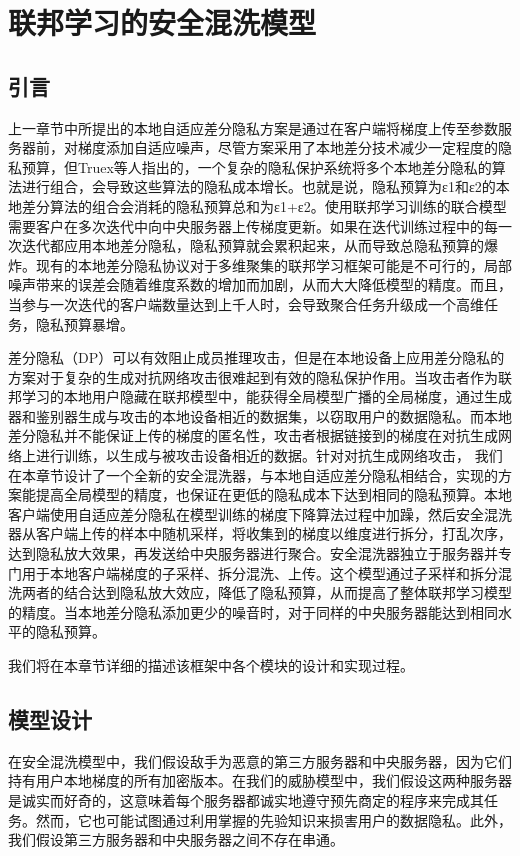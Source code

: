 \chapter{联邦学习的安全混洗模型}
\label{ch4}
\section{引言}
上一章节中所提出的本地自适应差分隐私方案是通过在客户端将梯度上传至参数服务器前，对梯度添加自适应噪声，尽管方案采用了本地差分技术减少一定程度的隐私预算，但Truex等人指出的，一个复杂的隐私保护系统将多个本地差分隐私的算法进行组合，会导致这些算法的隐私成本增长。也就是说，隐私预算为ε1和ε2的本地差分算法的组合会消耗的隐私预算总和为ε1+ε2。使用联邦学习训练的联合模型需要客户在多次迭代中向中央服务器上传梯度更新。如果在迭代训练过程中的每一次迭代都应用本地差分隐私，隐私预算就会累积起来，从而导致总隐私预算的爆炸。现有的本地差分隐私协议对于多维聚集的联邦学习框架可能是不可行的，局部噪声带来的误差会随着维度系数的增加而加剧，从而大大降低模型的精度。而且，当参与一次迭代的客户端数量达到上千人时，会导致聚合任务升级成一个高维任务，隐私预算暴增。

差分隐私（DP）可以有效阻止成员推理攻击，但是在本地设备上应用差分隐私的方案对于复杂的生成对抗网络攻击很难起到有效的隐私保护作用。当攻击者作为联邦学习的本地用户隐藏在联邦模型中，能获得全局模型广播的全局梯度，通过生成器和鉴别器生成与攻击的本地设备相近的数据集，以窃取用户的数据隐私。而本地差分隐私并不能保证上传的梯度的匿名性，攻击者根据链接到的梯度在对抗生成网络上进行训练，以生成与被攻击设备相近的数据。针对对抗生成网络攻击， 我们在本章节设计了一个全新的安全混洗器，与本地自适应差分隐私相结合，实现的方案能提高全局模型的精度，也保证在更低的隐私成本下达到相同的隐私预算。本地客户端使用自适应差分隐私在模型训练的梯度下降算法过程中加躁，然后安全混洗器从客户端上传的样本中随机采样，将收集到的梯度以维度进行拆分，打乱次序，达到隐私放大效果，再发送给中央服务器进行聚合。安全混洗器独立于服务器并专门用于本地客户端梯度的子采样、拆分混洗、上传。这个模型通过子采样和拆分混洗两者的结合达到隐私放大效应，降低了隐私预算，从而提高了整体联邦学习模型的精度。当本地差分隐私添加更少的噪音时，对于同样的中央服务器能达到相同水平的隐私预算。


我们将在本章节详细的描述该框架中各个模块的设计和实现过程。

\section{模型设计}
在安全混洗模型中，我们假设敌手为恶意的第三方服务器和中央服务器，因为它们持有用户本地梯度的所有加密版本。在我们的威胁模型中，我们假设这两种服务器是诚实而好奇的，这意味着每个服务器都诚实地遵守预先商定的程序来完成其任务。然而，它也可能试图通过利用掌握的先验知识来损害用户的数据隐私。此外，我们假设第三方服务器和中央服务器之间不存在串通。

